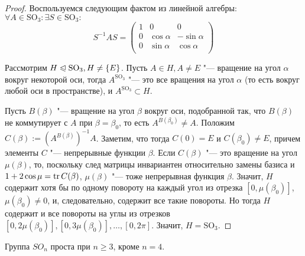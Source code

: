 \begin{proof}
	Воспользуемся следующим фактом из линейной алгебры: $\forall A \in \mathrm{SO}_3: \exists S \in \mathrm{SO_3}:$
	\[S^{-1}AS = \begin{pmatrix}
		1 & 0 & 0 \\
		0 & \cos\alpha & -\sin\alpha\\
		0 & \sin\alpha & \cos\alpha\\
	\end{pmatrix}\]
	
	Рассмотрим $H \trianglelefteqslant \mathrm{SO}_3, H \ne \{E\}$. Пусть $A \in H, A \ne E$ "--- вращение на угол $\alpha$ вокруг некоторой оси, тогда $A^{\mathrm{SO}_3}$ "--- это все вращения на угол $\alpha$ (то есть вокруг любой оси в пространстве), и $A^{\mathrm{SO}_3} \subset H$.
	
	Пусть $B(\beta)$ "--- вращение на угол $\beta$ вокруг оси, подобранной так, что $B(\beta)$ не коммутирует с $A$ при $\beta = \beta_0$, то есть $A^{B(\beta_0)} \ne A$. Положим $C(\beta) := (A^{B(\beta)})^{-1}A$. Заметим, что тогда $C(0) = E$ и $C(\beta_0) \ne E$, причем элементы $C$ "--- непрерывные функции $\beta$. Если $C(\beta)$ "--- это вращение на угол $\mu(\beta)$, то, поскольку след матрицы инвариантен относительно замены базиса и $1 + 2\cos\mu = \operatorname{tr} C(\beta)$, $\mu(\beta)$ "--- тоже непрерывная функция $\beta$. Значит, $H$ содержит хотя бы по одному повороту на каждый угол из отрезка $[0, \mu(\beta_0)]$, $\mu(\beta_0) \ne 0$, и, следовательно, содержит все такие повороты. Но тогда $H$ содержит и все повороты на углы из отрезков $[0, 2\mu(\beta_0)], [0, 3\mu(\beta_0)], \ldots, [0, 2\pi]$. Значит, $H = \mathrm{SO}_3$.
\end{proof}

\begin{note}
	Группа $SO_n$ проста при $n \ge 3$, кроме $n = 4$.
\end{note}